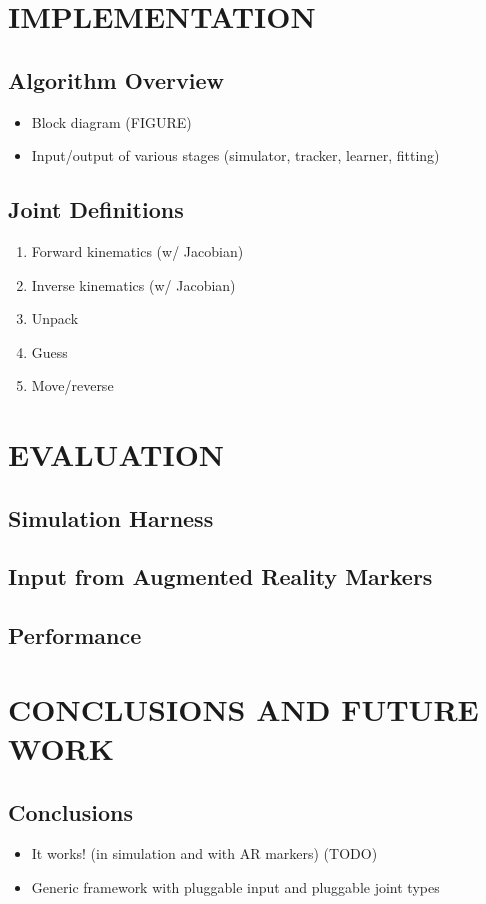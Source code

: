\documentclass[letterpaper, 10 pt, conference]{ieeeconf}  %
\begin{document}
\section{IMPLEMENTATION}

\subsection{Algorithm Overview}
    \begin{itemize}
      \item Block diagram (FIGURE)
      \item Input/output of various stages (simulator, tracker, learner, fitting)
    \end{itemize}
\subsection{Joint Definitions}
    \begin{enumerate}
      \item Forward kinematics (w/ Jacobian)
      \item Inverse kinematics (w/ Jacobian)
      \item Unpack
      \item Guess
      \item Move/reverse
    \end{enumerate}

\section{EVALUATION}

\subsection{Simulation Harness}
\subsection{Input from Augmented Reality Markers}
\subsection{Performance}

\section{CONCLUSIONS AND FUTURE WORK}

\subsection{Conclusions}
    \begin{itemize}
      \item It works! (in simulation and with AR markers) (TODO)
      \item Generic framework with pluggable input and pluggable joint types
    \end{itemize}
\end{document}
